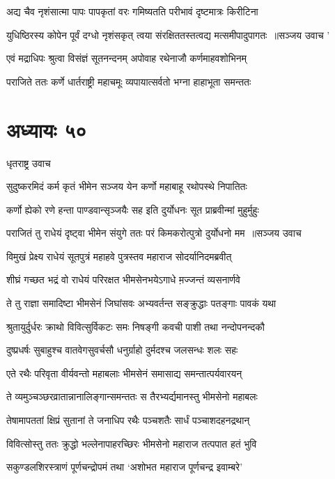 \twolineshloka
{अद्य चैव नृशंसात्मा पापः पापकृतां वरः}
{गमिष्यतति परीभावं दृष्टमात्रः किरीटिना}


\threelineshloka
{युधिष्ठिरस्य कोपेन पूर्वं दग्धो नृशंसकृत्}
{त्वया संरक्षिततस्तत्वद्य मत्समीपादुपागतः ॥सञ्जय उवाच}
{'}


\twolineshloka
{एवं मद्राधिपः श्रुत्वा विसंज्ञं सूतनन्दनम्}
{अपोवाह रथेनाजौ कर्णमाहवशोभिनम्}


\twolineshloka
{पराजिते ततः कर्णे धार्तराष्ट्री महाचमूः}
{व्यपायात्सर्वतो भग्ना हाहाभूता समन्ततः}


\chapter{अध्यायः ५०}
\twolineshloka
{धृतराष्ट्र उवाच}
{}


\twolineshloka
{सुदुष्करमिदं कर्म कृतं भीमेन सञ्जय}
{येन कर्णो महाबाहू रथोपस्थे निपातितः}


\twolineshloka
{कर्णो ह्येको रणे हन्ता पाण्डवान्सृञ्जयैः सह}
{इति दुर्योधनः सूत प्राब्रवीन्मां मुहुर्मुहुः}


\threelineshloka
{पराजितं तु राधेयं दृष्ट्वा भीमेन संयुगे}
{ततः परं किमकरोत्पुत्रो दुर्योधनो मम ॥सञ्जय उवाच}
{}


\twolineshloka
{विमुखं प्रेक्ष्य राधेयं सूतपुत्रं महाहवे}
{पुत्रस्तव महाराज सोदर्यानिदमब्रवीत्}


\twolineshloka
{शीघ्रं गच्छत भद्रं वो राधेयं परिरक्षत}
{भीमसेनभयेऽगाधे म़ज्जन्तं व्यसनार्णवे}


\twolineshloka
{ते तु राज्ञा समादिष्टा भीमसेनं जिघांसवः}
{अभ्यवर्तन्त सङ्क्रुद्धाः पतङ्गाः पावकं यथा}


\twolineshloka
{श्रुतायुर्दुर्धरः क्राथो विवित्सुर्विकटः समः}
{निषङ्गी कवची पाशी तथा नन्दोपनन्दकौ}


\twolineshloka
{दुष्प्रधर्षः सुबाहुश्च वातवेगसुवर्चसौ}
{धनुर्ग्राहो दुर्मदश्च जलसन्धः शलः सहः}


\twolineshloka
{एते रथैः परिवृता वीर्यवन्तो महाबलाः}
{भीमसेनं समासाद्य समन्तात्पर्यवारयन्}


\twolineshloka
{ते व्यमुञ्चञ्छरव्रातान्नानालिङ्गान्समन्ततः}
{स तैरभ्यर्द्यमानस्तु भीमसेनो महाबलः}


\twolineshloka
{तेषामापततां क्षिप्रं सुतानां ते जनाधिप}
{रथैः पञ्चशतैः सार्धं पञ्चाशदहनद्रथान्}


\twolineshloka
{विवित्सोस्तु ततः क्रुद्धो भल्लेनापाहरच्छिरः}
{भीमसेनो महाराज तत्पपात हतं भुवि}


\twolineshloka
{सकुण्डलशिरस्त्राणं पूर्णचन्द्रोपमं तथा}
{`अशोभत महाराज पूर्णचन्द्र इवाम्बरे'}


